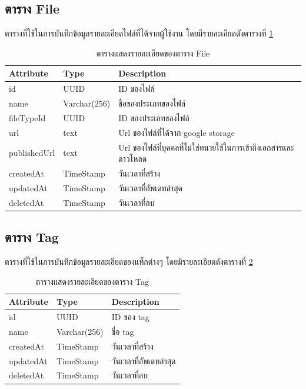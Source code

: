 \documentclass[12pt,oneside,openright,a4paper]{cpe-thai-project}
\begin{document}
\subsection{ตาราง File}
ตารางที่ใช้ในการบันทึกข้อมูลรายละเอียดไฟล์ที่ได้จากผู้ใช้งาน โดยมีรายละเอียดดังตารางที่ \ref{tbl:dbFile}
\begin{table}[!h]
    \centering
    \begin{tabular}{|l|l|l|}
    \hline
    \textbf{Attribute} & \textbf{Type} & \textbf{Description}   \\ \hline
    id                 & UUID          & ID ของไฟล์                                                      \\ \hline
    name               & Varchar(256)   & ชื่อของประเภทของไฟล์                                            \\ \hline
    fileTypeId         & UUID          & ID ของประเภทของไฟล์                                             \\ \hline
    url                & text          & Url ของไฟล์ที่ได้จาก google storage                             \\ \hline
    publishedUrl       & text          & Url ของไฟล์ที่บุคคลที่ไม่ใช่ทนายใช้ในการเข้าถึงเอกสารและดาวโหลด \\ \hline
    createdAt          & TimeStamp     & วันเวลาที่สร้าง                                                 \\ \hline
    updatedAt          & TimeStamp     & วันเวลาที่อัพเดทล่าสุด                                          \\ \hline
    deletedAt          & TimeStamp     & วันเวลาที่ลบ                                                    \\ \hline
    \end{tabular}
    \caption{\centering  ตารางแสดงรายละเอียดของตาราง File} \label{tbl:dbFile}
\end{table}

\subsection{ตาราง Tag}
ตารางที่ใช้ในการบันทึกข้อมูลรายละเอียดของแท็กต่างๆ โดยมีรายละเอียดดังตารางที่ \ref{tbl:dbTag}
\begin{table}[!h]
    \centering
    \begin{tabular}{|l|l|l|}
    \hline
    \textbf{Attribute} & \textbf{Type} & \textbf{Description}   \\ \hline
    id                 & UUID          & ID ของ tag             \\ \hline
    name               & Varchar(256)   & ชื่อ tag               \\ \hline
    createdAt          & TimeStamp     & วันเวลาที่สร้าง        \\ \hline
    updatedAt          & TimeStamp     & วันเวลาที่อัพเดทล่าสุด \\ \hline
    deletedAt          & TimeStamp     & วันเวลาที่ลบ       \\ \hline
    \end{tabular}
    \caption{\centering  ตารางแสดงรายละเอียดของตาราง Tag} \label{tbl:dbTag}
\end{table}
\end{document}
